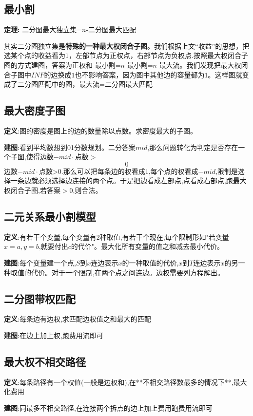 \documentclass[12pt, a4paper, oneside]{ctexart}
\begin{document}
\subsection{最小割}
\textbf{定理:} 二分图最大独立集=$n$-二分图最大匹配\par
其实二分图独立集是\textbf{特殊的一种最大权闭合子图}。我们根据上文“收益”的思想，把选某个点的收益看为$1$，左部节点为正权点，右部节点为负权点.按照最大权闭合子图的方式建图，答案为正权和-最小割=$n$-最小割=$n$-最大流。我们发现把最大权闭合子图中$INF$的边换成$1$也不影响答案，因为图中其他边的容量都为$1$。这样图就变成了二分图匹配中的图，最大流=二分图最大匹配


\subsection{最大密度子图}
\textbf{定义}:图的密度是图上的边的数量除以点数。求密度最大的子图。\par
\textbf{建图}:看到平均数想到01分数规划。二分答案$mid$,那么问题转化为判定是否存在一个子图,使得边数−$mid\cdot$点数$>$$$0$$边数−$mid \cdot$点数>$0$.那么可以把每条边的权看成$1$,每个点的权看成$−mid$,限制是选择一条边就必须选择边连接的两个点。于是把边看成左部点,点看成右部点,跑最大权闭合子图,若答案$>0$,则合法。


\subsection{二元关系最小割模型}
\textbf{定义}:有若干个变量,每个变量有2种取值,有若干个现在,每个限制形如"若变量$x=a,y=b$,就要付出$c$的代价"。最大化所有变量的值之和减去最小代价。\par
\textbf{建图}:每个变量建一个点,$S$到$x$连边表示$x$的一种取值的代价,$x$到$T$连边表示$x$的另一种取值的代价。对于一个限制,在两个点之间连边。边权需要列方程解出。


\subsection{二分图带权匹配}
\textbf{定义}:每条边有边权,求匹配边权值之和最大的匹配\par
\textbf{建图}:在边上加上权,跑费用流即可


\subsection{最大权不相交路径}
\textbf{定义}:每条路径有一个权值(一般是边权和),在**不相交路径数最多的情况下**,最大化费用\par
\textbf{建图}:同最多不相交路径,在连接两个拆点的边上加上费用跑费用流即可
\end{document}
